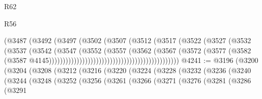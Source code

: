 \begin{lexlean}{R62}
\begin{lexlean}{R56}
\begin{coremodule}
{{{{{{{{{{{{{{{{{{{{{{{{{{{{{{{{{{{{{{{{{{{{{{{{{{{{{{{{{{{{{{{{{{{{{{{{{{{{{{{{{{{{{{{{{{{{{{{{{{{{{{{{{{{{{{{{{{{{{{{{{{{{{{{{{{{{{{{{{{{{{{{{{{{{{{{{{{{{{{{{{{{{{{{{{{{{{{{{{{{{{{{{{{{{{{{{{{{{{{{{{{{{{{{{{{{                                                        (@3487
                                                          (@3492
                                                            (@3497
                                                              (@3502
                                                                (@3507
                                                                  (@3512
                                                                    (@3517
                                                                      (@3522
                                                                        (@3527
                                                                          (@3532
                                                                            (@3537
                                                                              (@3542
                                                                                (@3547
                                                                                  (@3552
                                                                                    (@3557
                                                                                      (@3562
                                                                                        (@3567
                                                                                          (@3572
                                                                                            (@3577
                                                                                              (@3582
                                                                                                (@3587
                                                                                                  @4145)))))))))))))))))))))))))))))))))))))))))))))))
@4241 := @3196
    (@3200
      (@3204
        (@3208
          (@3212
            (@3216
              (@3220
                (@3224
                  (@3228
                    (@3232
                      (@3236
                        (@3240
                          (@3244
                            (@3248
                              (@3252
                                (@3256
                                  (@3261
                                    (@3266
                                      (@3271
                                        (@3276
                                          (@3281
                                            (@3286
                                              (@3291
}}}}}}}}}}}}}}}}}}}}}}}}}}}}}}}}}}}}}}}}}}}}}}}}}}}}}}}}}}}}}}}}}}}}}}}}}}}}}}}}}}}}}}}}}}}}}}}}}}}}}}}}}}}}}}}}}}}}}}}}}}}}}}}}}}}}}}}}}}}}}}}}}}}}}}}}}}}}}}}}}}}}}}}}}}}}}}}}}}}}}}}}}}}}}}}}}}}}}}}}}}}}}}}}}}}
\end{coremodule}
\end{lexlean}
\end{lexlean}
